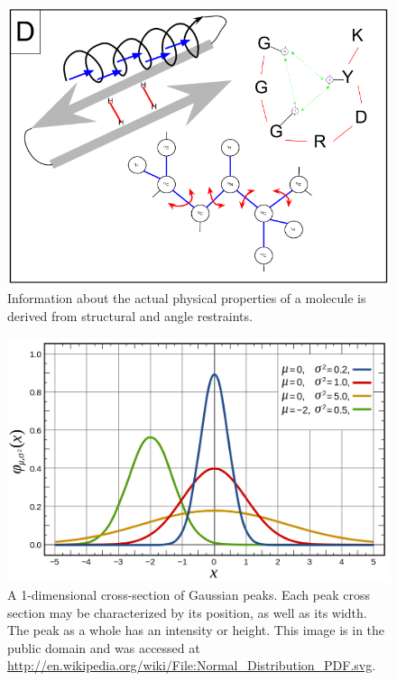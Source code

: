 \begin{figure}
  \includegraphics[scale=0.6]{figures/data_overview_4}
  \caption[Information about the actual physical properties of a molecule.]
          {Information about the actual physical properties of a molecule
           is derived from structural and angle restraints.}
  \label{data_overview_4}
\end{figure}

\begin{figure}
  \includegraphics[scale=0.4]{figures/peak_1d}
  \caption[A 1-dimensional cross-section of Gaussian peaks]
          {A 1-dimensional cross-section of Gaussian peaks.
           Each peak cross section may be characterized by its 
           position, as well as its width.  The peak as a whole
           has an intensity or height.  This image is in the
           public domain and was accessed at 
           \url{http://en.wikipedia.org/wiki/File:Normal_Distribution_PDF.svg}.}
  \label{peak_1d}
\end{figure}

